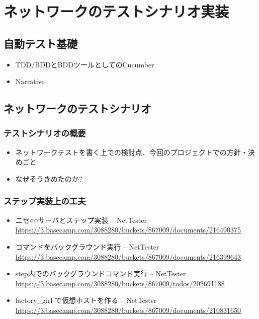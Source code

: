 
\chapter{ネットワークのテストシナリオ実装}

\section{自動テスト基礎}

\begin{itemize}
 \item TDD/BDDとBDDツールとしてのCucumber
 \item Narrative
\end{itemize}

\section{ネットワークのテストシナリオ}

\subsection{テストシナリオの概要}

\begin{itemize}
 \item ネットワークテストを書く上での検討点、今回のプロジェクトでの方針・決めごと
 \item なぜそうきめたのか?
\end{itemize}

\subsection{ステップ実装上の工夫}
\begin{itemize}
 \item ニセ○○サーバとステップ実装 – NetTester \url{https://3.basecamp.com/3088280/buckets/867009/documents/216490375}
 \item コマンドをバックグラウンド実行 – NetTester \url{https://3.basecamp.com/3088280/buckets/867009/documents/216399643}
 \item step内でのバックグラウンドコマンド実行 – NetTester \url{https://3.basecamp.com/3088280/buckets/867009/todos/202691188}
 \item factory\_girl で仮想ホストを作る – NetTester \url{https://3.basecamp.com/3088280/buckets/867009/documents/210831650}
\end{itemize}

